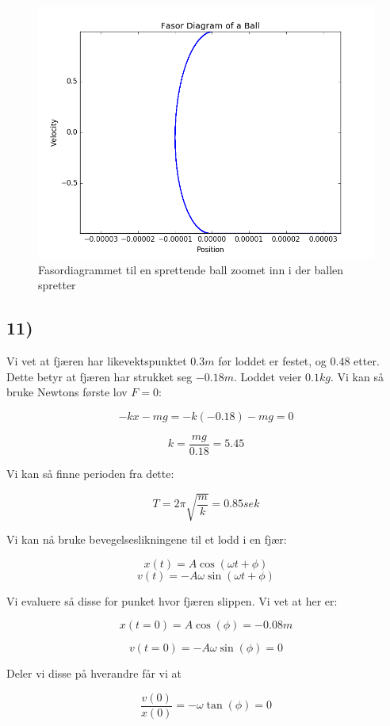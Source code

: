 \documentclass[a4paper,norsk, 10pt]{article}
\begin{document}
\begin{figure}[H]
\centering

\includegraphics[scale=0.5]{ballSprett.png}
\caption{Fasordiagrammet til en sprettende ball zoomet inn i der ballen spretter}
\end{figure}

\subsection*{11)}
Vi vet at fjæren har likevektspunktet $0.3m$ før loddet er festet, og $0.48$ etter. Dette betyr at fjæren har strukket seg $-0.18m$. Loddet veier $0.1kg$. Vi kan så bruke Newtons første lov $F = 0$:

$$
-kx-mg = -k(-0.18) -mg = 0
$$

$$
k = \frac{mg}{0.18} = 5.45
$$

Vi kan så finne perioden fra dette:

$$
T = 2\pi \sqrt{\frac{m}{k}} = 0.85 sek
$$

Vi kan nå bruke bevegelseslikningene til et lodd i en fjær:

$$
x(t) = A\cos(\omega t + \phi)
$$
$$
v(t) = -A\omega \sin(\omega t+ \phi)
$$

Vi evaluere så disse for punket hvor fjæren slippen. Vi vet at her er:

$$
x(t=0) = A\cos(\phi) = -0.08 m
$$

$$
v(t=0) = -A\omega \sin(\phi) = 0
$$

Deler vi disse på hverandre får vi at

$$
\frac{v(0)}{x(0)} = -\omega \tan(\phi) = 0
$$
\end{document}
